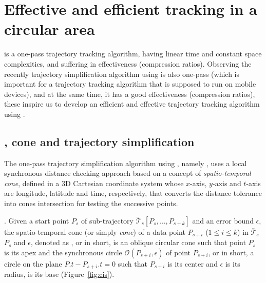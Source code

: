 \section{Effective and efficient tracking in a circular area}
\label{sec:circle}

\ldrh is a one-pass trajectory tracking algorithm, having linear time and constant space complexities, and suffering in effectiveness (compression ratios).
Observing the recently trajectory simplification algorithm \cised using \sed is also one-pass (which is important for a trajectory tracking algorithm that is supposed to run on mobile devices), and at the same time, it has a good effectiveness (compression ratios), these inspire us to develop an efficient and effective trajectory tracking algorithm using \sed.



\subsection{\sed, cone and trajectory simplification}
The one-pass trajectory simplification algorithm using \sed, namely \cised \cite{Lin:Cised}, uses a local synchronous distance checking approach based on a concept of \textit{spatio-temporal cone}, defined in a 3D Cartesian coordinate system whose $x$-axis, $y$-axis and $t$-axis are longitude, latitude and time, respectively, that converts the \sed distance tolerance into cones intersection for testing the successive points.%

. 
Given a start point $P_s$ of sub-trajectory $\dddot{\mathcal{T}}_s[P_s, \ldots, P_{s+k}]$ and an error bound $\epsilon$, the spatio-temporal cone (or simply \textit{cone}) of a data point $P_{s+i}$ ($1\le i\le k$) in $\dddot{\mathcal{T}_s}$ \wrt $P_s$ and $\epsilon$, denoted as , or  in short, is an oblique circular cone such that point $P_s$ is its apex and the synchronous circle $\mathcal{O}(P_{s+i}, \epsilon)$ of point $P_{s+i}$, or  in short, a circle on the plane $P.t-P_{s+i}.t = 0$ such that $P_{s+i}$ is its center and $\epsilon$ is its radius, is its base (Figure~\ref{fig:cis}).


